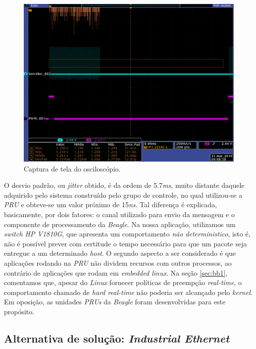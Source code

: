 \FloatBarrier

\begin{figure}[h]

\centering
\includegraphics[scale=0.35]{image/tek_com_threads}
\caption {Captura de tela do osciloscópio.}
\label{fig:osciloscopio_thread}
\end{figure}

\FloatBarrier

O desvio padrão, ou \textit{jitter} obtido, é da ordem de 5.7\textit{ms}, muito
distante daquele adquirido pelo sistema construído pelo grupo de controle, no
qual utilizou-se a \textit{PRU} e obteve-se um valor próximo de 15\textit{ns}.
Tal diferença é explicada, basicamente, por dois fatores: o canal utilizado para
envio da mensagem e o componente de processamento da \textit{Beagle}. Na nossa
aplicação, utilizamos um \textit{switch HP V1810G}, que apresenta um
comportamento \textit{não deterministico}, isto é, não é possível prever com
certitude o tempo necessário para que um pacote seja entregue a um determinado
\textit{host}. O segundo aspecto a ser considerado é que aplicações rodando na
\textit{PRU} não dividem recursos com outros processos, ao contrário de
aplicações que rodam em \textit{embedded linux}. Na seção \ref{sec:bb1},
comentamos que, apesar do \textit{Linux} fornecer políticas de preempção
\textit{real-time}, o comportamento chamado de \textit{hard real-time} não
poderia ser alcançado pelo \textit{kernel}. Em oposição, as unidades
\textit{PRUs} da \textit{Beagle} foram desenvolvidas para este propósito.

\subsection{Alternativa de solução: \textit{Industrial Ethernet}}


